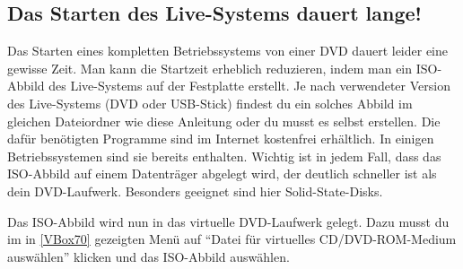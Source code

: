 \documentclass[a4paper,10pt,BCOR=0mm,DIV=14]{scrartcl}
\newcommand{\command}[1]{\textsf{\enquote{#1}}}
\begin{document}
\subsection{Das Starten des Live-Systems dauert lange!}
Das Starten eines kompletten Betriebssystems von einer DVD dauert leider eine gewisse Zeit. Man kann die Startzeit erheblich reduzieren, indem man ein ISO-Abbild des Live-Systems auf der Festplatte erstellt. Je nach verwendeter Version des Live-Systems (DVD oder USB-Stick) findest du ein solches Abbild im gleichen Dateiordner wie diese Anleitung oder du musst es selbst erstellen. Die dafür benötigten Programme sind im Internet kostenfrei erhältlich. In einigen Betriebssystemen sind sie bereits enthalten. Wichtig ist in jedem Fall, dass das ISO-Abbild auf einem Datenträger abgelegt wird, der deutlich schneller ist als dein DVD-Laufwerk. Besonders geeignet sind hier Solid-State-Disks.

Das ISO-Abbild wird nun in das virtuelle DVD-Laufwerk gelegt. Dazu musst du im in \cref{VBox70} gezeigten Menü auf \command{Datei für virtuelles CD/DVD-ROM-Medium auswählen} klicken und das ISO-Abbild auswählen.
\end{document}
